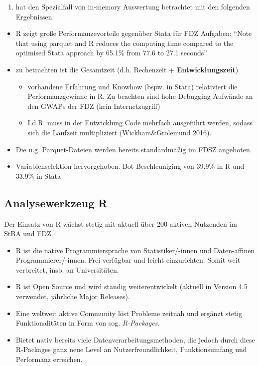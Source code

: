 \documentclass[
  german,
  10pt,
  twoside]{article}
\providecommand{\tightlist}{%
  \setlength{\itemsep}{0pt}\setlength{\parskip}{0pt}}
\begin{document}
\begin{enumerate}
\def\labelenumi{(\arabic{enumi})}
\tightlist
\item
  hat den Spezialfall von in-memory Auswertung betrachtet mit den
  folgenden Ergebnissen:
\end{enumerate}

\begin{itemize}
\tightlist
\item
  R zeigt große Performanzevorteile gegenüber Stata für FDZ Aufgaben:
  ``Note that using parquet and R reduces the computing time compared to
  the optimised Stata approach by 65.1\% from 77.6 to 27.1 seconds''
\item
  zu betrachten ist die Gesamtzeit (d.h. Rechenzeit +
  \textbf{Entwicklungszeit})

  \begin{itemize}
  \tightlist
  \item
    vorhandene Erfahrung und Knowhow (bspw. in Stata) relativiert die
    Performanzgewinne in R. Zu beachten sind hohe Debugging Aufwände an
    den GWAPs der FDZ (kein Internetzugriff)
  \item
    I.d.R. muss in der Entwicklung Code mehrfach ausgeführt werden,
    sodass sich die Laufzeit multipliziert (Wickham\&Grolemund 2016).
  \end{itemize}
\item
  Die u.g. Parquet-Dateien werden bereits standardmäßig im FDSZ
  angeboten.
\item
  Variablenselektion hervorgehoben. Bot Beschleuniging von 39.9\% in R
  und 33.9\% in Stata
\end{itemize}

\subsection{Analysewerkzeug R}\label{analysewerkzeug-r}

Der Einsatz von R wächst stetig mit aktuell über 200 aktiven Nutzenden
im StBA und FDZ.

\begin{itemize}
\tightlist
\item
  R ist die native Programmiersprache von Statistiker/-innen und
  Daten-affinen Programmierer/-innen. Frei verfügbar und leicht
  einzurichten. Somit weit verbreitet, insb. an Universitäten.
\item
  R ist Open Source und wird ständig weiterentwickelt (aktuell in
  Version 4.5 verwendet, jährliche Major Releases).
\item
  Eine weltweit aktive Community löst Probleme zeitnah und ergänzt
  stetig Funktionalitäten in Form von sog. \emph{R-Packages}.
\item
  Bietet nativ bereits viele Datenverarbeitungsmethoden, die jedoch
  durch diese R-Packages ganz neue Level an Nutzerfreundlichkeit,
  Funktionsumfang und Performanz erreichen.
\end{itemize}
\end{document}
